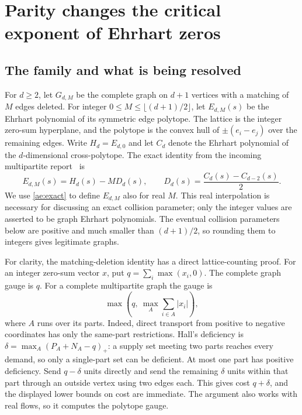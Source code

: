 \section{Parity changes the critical exponent of Ehrhart zeros}
\label{sec:ehrhart-critical}

\subsection{The family and what is being resolved}
For $d\ge2$, let $G_{d,M}$ be the complete graph on $d+1$ vertices with a matching of
$M$ edges deleted. For integer $0\le M\le\lfloor(d+1)/2\rfloor$, let
$E_{d,M}(s)$ be the Ehrhart polynomial of its symmetric edge polytope.
The lattice is the integer zero-sum hyperplane, and the polytope is the
convex hull of $\pm(e_i-e_j)$ over the remaining edges. Write $H_d=E_{d,0}$
and let $C_d$ denote the Ehrhart polynomial of the $d$-dimensional
cross-polytope. The exact identity from the incoming multipartite
report~\cite{EhrhartIncoming} is
\begin{equation}\label{ae:exact}
 E_{d,M}(s)=H_d(s)-M D_d(s),\qquad
 D_d(s)=\frac{C_d(s)-C_{d-2}(s)}2. 
\end{equation}
We use \eqref{ae:exact} to define $E_{d,M}$ also for real $M$. This real
interpolation is necessary for discussing an exact collision parameter;
only the integer values are asserted to be graph Ehrhart polynomials.
The eventual collision parameters below are positive and much smaller
than $(d+1)/2$, so rounding them to integers gives legitimate graphs.

For clarity, the matching-deletion identity has a direct lattice-counting
proof. For an integer zero-sum vector $x$, put $q=\sum_i\max(x_i,0)$.
The complete graph gauge is $q$. For a complete multipartite graph the
gauge is
\[
 \max\left(q,\ \max_A\sum_{i\in A}|x_i|\right),
\]
where $A$ runs over its parts. Indeed, direct transport from positive to
negative coordinates has only the same-part restrictions. Hall's
deficiency is $\delta=\max_A(P_A+N_A-q)_+$: a supply set meeting two
parts reaches every demand, so only a single-part set can be deficient.
At most one part has positive deficiency. Send $q-\delta$ units directly
and send the remaining $\delta$ units within that part through an outside
vertex using two edges each. This gives cost $q+\delta$, and the displayed
lower bounds on cost are immediate. The argument also works with real
flows, so it computes the polytope gauge.

